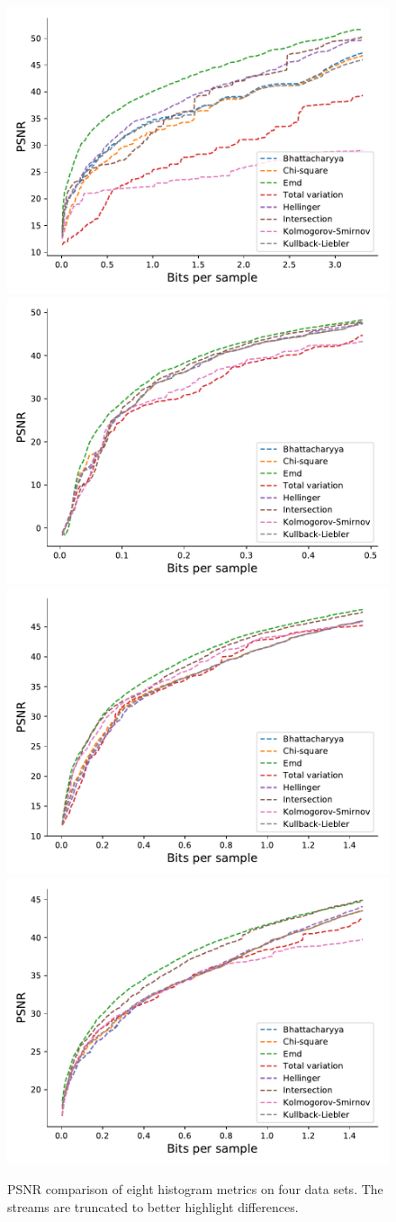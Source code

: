 \begin{figure}
	\centering
	{\includegraphics[width=0.48\linewidth]{img/histogram/different-metrics/boiler-histogram-metrics.pdf}}
	{\includegraphics[width=0.48\linewidth]{img/histogram/different-metrics/kflame-histogram-metrics.pdf}}
	{\includegraphics[width=0.48\linewidth]{img/histogram/different-metrics/miranda-diffusivity-histogram-metrics.pdf}}
	{\includegraphics[width=0.48\linewidth]{img/histogram/different-metrics/turbulence-histogram-metrics.pdf}}
	\caption{PSNR comparison of eight histogram metrics on four data sets. The streams are truncated to better highlight differences.}
	\label{fig:histogram-metrics-comparison}
\end{figure}

